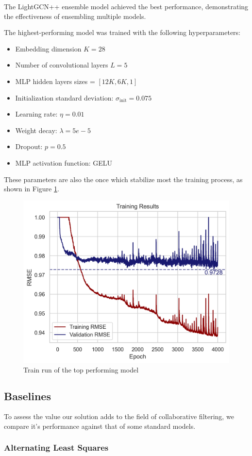\documentclass[10pt,conference,compsocconf]{IEEEtran}
\begin{document}
The LightGCN++ ensemble model achieved the best performance, demonstrating the effectiveness of ensembling multiple models.

The highest-performing model was trained with the following hyperparameters:
\begin{itemize}
  \item Embedding dimension $K = 28$
  \item Number of convolutional layers $L = 5$
  \item MLP hidden layers sizes = $[12K, 6K, 1]$
  \item Initialization standard deviation: $\sigma_{\text{init}}=0.075$
  \item Learning rate: $\eta=0.01$
  \item Weight decay: $\lambda=5e-5$
  \item Dropout: $p=0.5$
  \item MLP activation function: GELU
\end{itemize}

These parameters are also the once which stabilize most the training process, as shown in Figure \ref{fig:top-model}.
\begin{figure}[h]
  \centering
  \includegraphics[width=0.7\linewidth]{image.png}
  \caption{Train run of the top performing model}
  \label{fig:top-model}
\end{figure}
\subsection{Baselines}

To assess the value our solution adds to the field of collaborative filtering, we compare it's performance against that of some standard models.

\subsubsection{Alternating Least Squares}
\end{document}
